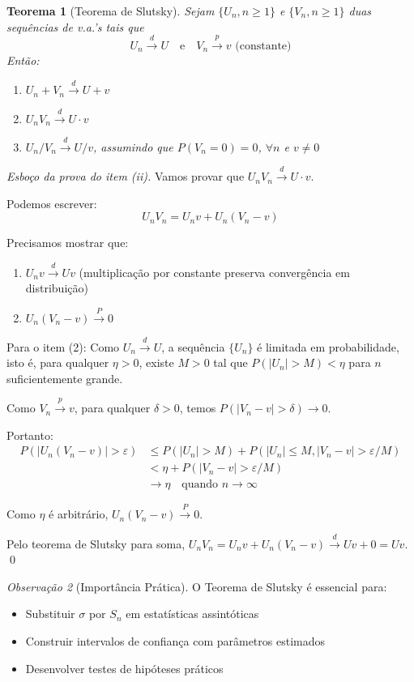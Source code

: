 \documentclass[12pt,a4paper]{article}
\theoremstyle{plain}
\newtheorem{teorema}{Teorema}[section]
\theoremstyle{definition}
\theoremstyle{remark}
\newtheorem{observacao}[teorema]{Observação}
\begin{document}
\begin{teorema}[Teorema de Slutsky]
Sejam $\{U_n, n \geq 1\}$ e $\{V_n, n \geq 1\}$ duas sequências de v.a.'s tais que
\[
U_n \xrightarrow{d} U \quad \text{e} \quad V_n \xrightarrow{p} v \text{ (constante)}
\]
Então:
\begin{enumerate}
    \item $U_n + V_n \xrightarrow{d} U + v$
    \item $U_n V_n \xrightarrow{d} U \cdot v$
    \item $U_n / V_n \xrightarrow{d} U / v$, assumindo que $P(V_n = 0) = 0$, $\forall n$ e $v \neq 0$
\end{enumerate}
\end{teorema}

\begin{proof}[Esboço da prova do item (ii)]
Vamos provar que $U_n V_n \xrightarrow{d} U \cdot v$.

Podemos escrever:
\[
U_n V_n = U_n v + U_n(V_n - v)
\]

Precisamos mostrar que:
\begin{enumerate}
    \item $U_n v \xrightarrow{d} U v$ (multiplicação por constante preserva convergência em distribuição)
    \item $U_n(V_n - v) \xrightarrow{P} 0$
\end{enumerate}

Para o item (2): Como $U_n \xrightarrow{d} U$, a sequência $\{U_n\}$ é limitada em probabilidade, isto é, para qualquer $\eta > 0$, existe $M > 0$ tal que $P(|U_n| > M) < \eta$ para $n$ suficientemente grande.

Como $V_n \xrightarrow{p} v$, para qualquer $\delta > 0$, temos $P(|V_n - v| > \delta) \to 0$.

Portanto:
\begin{align}
P(|U_n(V_n - v)| > \varepsilon) &\leq P(|U_n| > M) + P(|U_n| \leq M, |V_n - v| > \varepsilon/M) \\
&< \eta + P(|V_n - v| > \varepsilon/M) \\
&\to \eta \quad \text{quando } n \to \infty
\end{align}

Como $\eta$ é arbitrário, $U_n(V_n - v) \xrightarrow{P} 0$.

Pelo teorema de Slutsky para soma, $U_n V_n = U_n v + U_n(V_n - v) \xrightarrow{d} Uv + 0 = Uv$. \qed
\end{proof}

\begin{observacao}[Importância Prática]
O Teorema de Slutsky é essencial para:
\begin{itemize}
    \item Substituir $\sigma$ por $S_n$ em estatísticas assintóticas
    \item Construir intervalos de confiança com parâmetros estimados
    \item Desenvolver testes de hipóteses práticos
\end{itemize}
\end{observacao}
\end{document}
